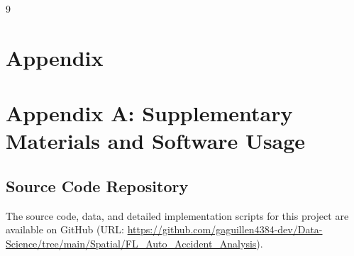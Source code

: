 \documentclass[conference]{IEEEtran}
\begin{document}
\begin{thebibliography}{9}
\section*{\textbf{Appendix}}

\section*{Appendix A: Supplementary Materials and Software Usage}
\subsection*{Source Code Repository \label{app:code}}
The source code, data, and detailed implementation scripts for this project are available on GitHub (URL: \url{https://github.com/gaguillen4384-dev/Data-Science/tree/main/Spatial/FL_Auto_Accident_Analysis}).


\end{thebibliography}
\end{document}
